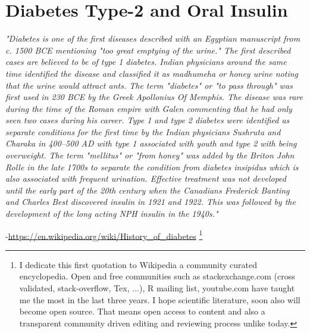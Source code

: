\chapter{Diabetes Type-2 and Oral Insulin}


\textit{"Diabetes is one of the first diseases described with an Egyptian manuscript from c. 1500 BCE mentioning "too great emptying of the urine." The first described cases are believed to be of type 1 diabetes. Indian physicians around the same time identified the disease and classified it as madhumeha or honey urine noting that the urine would attract ants. The term "diabetes" or "to pass through" was first used in 230 BCE by the Greek Apollonius Of Memphis. The disease was rare during the time of the Roman empire with Galen commenting that he had only seen two cases during his career. Type 1 and type 2 diabetes were identified as separate conditions for the first time by the Indian physicians Sushruta and Charaka in 400–500 AD with type 1 associated with youth and type 2 with being overweight. The term "mellitus" or "from honey" was added by the Briton John Rolle in the late 1700s to separate the condition from diabetes insipidus which is also associated with frequent urination. Effective treatment was not developed until the early part of the 20th century when the Canadians Frederick Banting and Charles Best discovered insulin in 1921 and 1922. This was followed by the development of the long acting NPH insulin in the 1940s."}

-\url{https://en.wikipedia.org/wiki/History_of_diabetes} \footnote{I dedicate this first quotation to Wikipedia a community curated encyclopedia. Open and free communities such as stackexchange.com (cross validated, stack-overflow, Tex, ...), R mailing list, youtube.com have taught me the most in the last three years. I hope scientific literature, soon also will become open source. That means open access to content and also a transparent community driven editing and reviewing process unlike today.}
\newpage

